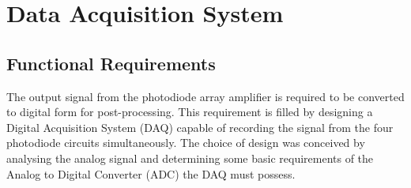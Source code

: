 \section{Data Acquisition System}





\subsection{Functional Requirements}
The output signal from the photodiode array amplifier is required to be converted to digital form for post-processing. This requirement is filled by designing a Digital Acquisition System (DAQ) capable of recording the signal from the four photodiode circuits simultaneously.
The choice of design was conceived by analysing the analog signal and determining some basic requirements of the Analog to Digital Converter (ADC) the DAQ must possess. 
%
%
